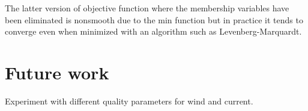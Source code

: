 \documentclass{article}
\newcommand{\minfun}{\text{min}}
\begin{document}
The latter version of objective function where the membership variables have been eliminated is nonsmooth due to the $\minfun$ function but in practice it tends to converge even when minimized with an algorithm such as Levenberg-Marquardt.

\section{Future work}
Experiment with different quality parameters for wind and current.
\end{document}
